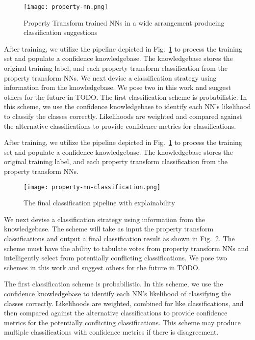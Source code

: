 \documentclass[conference]{IEEEtran}
\begin{document}
\begin{figure}[htbp]
\centerline{\texttt{[image: property-nn.png]}}
\caption{Property Transform trained NNs in a wide arrangement producing classification suggestions}
\label{widenn}
\end{figure}

After training, we utilize the pipeline depicted in Fig.~\ref{widenn} to process the training set and populate a confidence knowledgebase.  The knowledgebase stores the original training label, and each property transform classification from the property transform NNs.
We next devise a classification strategy using information from the knowledgebase.  We pose two in this work and suggest others for the future in TODO.
The first classification scheme is probabilistic.  In this scheme, we use the confidence knowledgebase to identify each NN's likelihood to classify the classes correctly.  Likelihoods are weighted and compared against the alternative classifications to provide confidence metrics for classifications.

After training, we utilize the pipeline depicted in Fig.~\ref{widenn} to process the training set and populate a confidence knowledgebase.  The knowledgebase stores the original training label, and each property transform classification from the property transform NNs.

\begin{figure}[htbp]
\centerline{\texttt{[image: property-nn-classification.png]}}
\caption{The final classification pipeline with explainability}
\label{widennexp}
\end{figure}

We next devise a classification strategy using information from the knowledgebase.  The scheme will take as input the property transform classifications and output a final classification result as shown in Fig.~\ref{widennexp}.   The scheme must have the ability to tabulate votes from property transform NNs and intelligently select from potentially conflicting classifications.  We pose two schemes in this work and suggest others for the future in TODO.

The first classification scheme is probabilistic.  In this scheme, we use the confidence knowledgebase to identify each NN's likelihood of classifying the classes correctly.  Likelihoods are weighted, combined for like classifications, and then compared against the alternative classifications to provide confidence metrics for the potentially conflicting classifications.  This scheme may produce multiple classifications with confidence metrics if there is disagreement.
\end{document}
